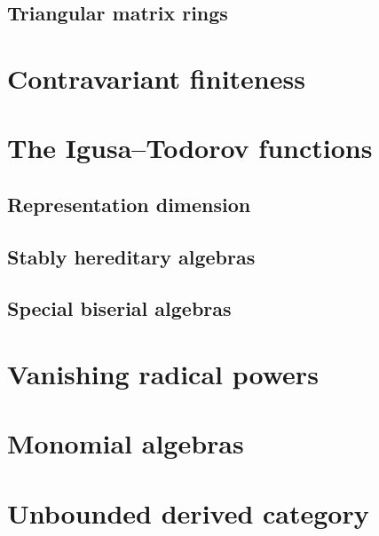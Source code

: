 \documentclass[11pt, a4paper, english]{article}
\theoremstyle{definition}
\begin{document}
\subsection{Triangular matrix rings}\label{sec:Triangular_matrix_rings}


\section{Contravariant finiteness}


%

\section{The Igusa--Todorov functions} \label{sec:Igusa-Todorov}


\subsection{Representation dimension}\label{sec:repdimension}


\subsection{Stably hereditary algebras}\label{sec:stable_hereditary_algebras}


\subsection{Special biserial algebras}\label{sec:special_biserial_algebras}


\section{Vanishing radical powers}\label{sec:vanishing_radical}


\section{Monomial algebras}\label{sec:monomial_algebras}


\section{Unbounded derived category}\label{sec:Unbounded_derived_category}

\end{document}
